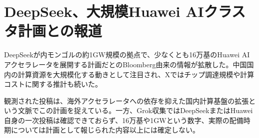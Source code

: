 \section{DeepSeek、大規模Huawei AIクラスタ計画との報道}

DeepSeekが内モンゴルの約1GW規模の拠点で、少なくとも16万基のHuawei AIアクセラレータを展開する計画だとのBloomberg由来の情報が拡散した。中国国内の計算資源を大規模化する動きとして注目され、Xではチップ調達規模や計算コストに関する推計も続いた。

観測された投稿は、海外アクセラレータへの依存を抑えた国内計算基盤の拡張という文脈でこの計画を捉えている。一方、Grok収集ではDeepSeekまたはHuawei自身の一次投稿は確認できておらず、16万基や1GWという数字、実際の配備時期については計画として報じられた内容以上には確定しない。

